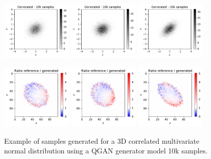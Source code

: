 \documentclass[twocolumn,preprintnumbers,superscriptaddress]{revtex4-2}
\begin{document}
\begin{figure}
  \includegraphics[width=0.3\textwidth]{plots/3Dgaussian_posdef/1-2_FAKE_10k.pdf}%
  \includegraphics[width=0.3\textwidth]{plots/3Dgaussian_posdef/2-3_FAKE_10k.pdf}%
  \includegraphics[width=0.3\textwidth]{plots/3Dgaussian_posdef/3-1_FAKE_10k.pdf}

  \includegraphics[width=0.3\textwidth]{plots/3Dgaussian_posdef/1-2_RATIO_10k.pdf}%
  \includegraphics[width=0.3\textwidth]{plots/3Dgaussian_posdef/2-3_RATIO_10k.pdf}%
  \includegraphics[width=0.3\textwidth]{plots/3Dgaussian_posdef/3-1_RATIO_10k.pdf}

  \caption{\label{fig:3dgauss}Example of samples generated for a 3D correlated
  multivariate normal distribution using a QGAN generator model 10k samples.}
\end{figure}
\end{document}
